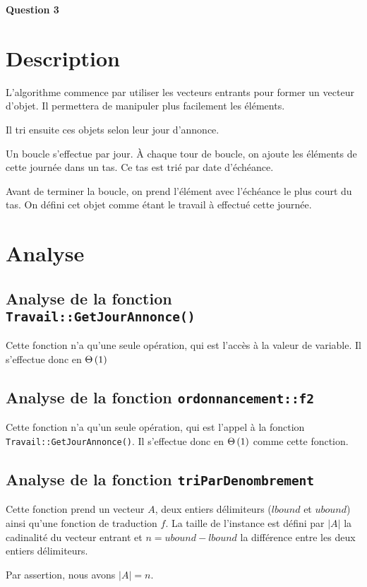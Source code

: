 \documentclass[class=article]{standalone}
\begin{document}
\centerline{\Huge \bf Question 3}
\bigskip

\section*{Description}
L'algorithme commence par utiliser les vecteurs entrants pour former un vecteur d'objet. 
Il permettera de manipuler plus facilement les éléments.

Il tri ensuite ces objets selon leur jour d'annonce.

Un boucle s'effectue par jour. À chaque tour de boucle, on ajoute les éléments de cette journée dans un tas.
Ce tas est trié par date d'échéance.

Avant de terminer la boucle, on prend l'élément avec l'échéance le plus court du tas. 
On défini cet objet comme étant le travail à effectué cette journée.

\section*{Analyse}

\subsection*{Analyse de la fonction \lstinline{Travail::GetJourAnnonce()}}
Cette fonction n'a qu'une seule opération, qui est l'accès à la valeur de variable.
Il s'effectue donc en $\Theta\left ( 1 \right )$

\subsection*{Analyse de la fonction \lstinline{ordonnancement::f2}}
Cette fonction n'a qu'un seule opération, qui est l'appel à la fonction \lstinline{Travail::GetJourAnnonce()}.
Il s'effectue donc en $\Theta\left ( 1 \right )$ comme cette fonction.

\subsection*{Analyse de la fonction \lstinline{triParDenombrement}}
Cette fonction prend un vecteur $A$, deux entiers délimiteurs ($lbound$ et $ubound$) ainsi qu'une fonction de traduction $f$.
La taille de l'instance est défini par $|A|$ la cadinalité du vecteur entrant et $n = ubound - lbound$ la différence entre
les deux entiers délimiteurs.

Par assertion, nous avons $|A| = n$.
\end{document}
